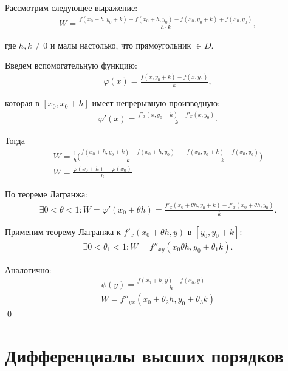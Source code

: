 \documentclass[a4paper,12pt,oneside]{extbook}
\theoremstyle{numbered}
\theoremstyle{unnumbered}
\theoremstyle{named}
\theoremstyle{unnumbered}
\theoremstyle{named}
\theoremstyle{named}
\theoremstyle{named}
\renewenvironment{proof}{{\noindent\textsc{Доказательство.}}}{\qed}
\begin{document}
\begin{proof}
    Рассмотрим следующее выражение:
    \begin{gather*}
        W = \frac{f(x_0 + h, y_0 + k) - f(x_0 + h, y_0) - f(x_0, y_0 + k) + f(x_0, y_0)}{h \cdot k},
    \end{gather*}

    где \(h, k \neq 0\) и малы настолько, что прямоугольник %
    \(\in D\).

    Введем вспомогательную функцию:
    \begin{gather*}
        \varphi(x) = \frac{f(x, y_0 + k) - f(x, y_0)}{k},
    \end{gather*}

    которая в \([x_0, x_0 + h]\) имеет непрерывную производную:
    \begin{gather*}
        \varphi'(x) = \frac{f'_x(x, y_0 + k) - f'_x(x, y_0)}{k}.
    \end{gather*}

    Тогда
    \begin{gather*}
        W = \frac{1}{h} \Big( \frac{f(x_0 + h, y_0 + k) - f(x_0 + h, y_0)}{k} - \frac{f(x_0, y_0 + k) - f(x_0, y_0)}{k} \Big) \\
        W = \frac{\varphi(x_0 + h) - \varphi(x_0)}{h}
    \end{gather*}

    По теореме Лагранжа:
    \begin{gather*}
        \exists 0 < \theta < 1: W = \varphi'(x_0 + \theta h) = \frac{f'_x(x_0 + \theta h, y_0 + k) - f'_x(x_0 + \theta h, y_0)}{k}.
    \end{gather*}

    Применим теорему Лагранжа к \(f'_x(x_0 + \theta h, y)\) в \([y_0, y_0 + k]\):
    \begin{gather*}
        \exists 0 < \theta_1 < 1: W = f''_{xy}(x_0 \theta h, y_0 + \theta_1 k).
    \end{gather*}

    Аналогично:
    \begin{gather*}
        \psi (y) = \frac{f(x_0 + h, y) - f(x_0, y)}{h} \\
        W = f''_{yx}(x_0 + \theta_2 h, y_0 + \theta_3 k)
    \end{gather*}
\end{proof}

\section{Дифференциалы высших порядков}%
\label{sec:Дифференциалы высших порядков}
\end{document}
